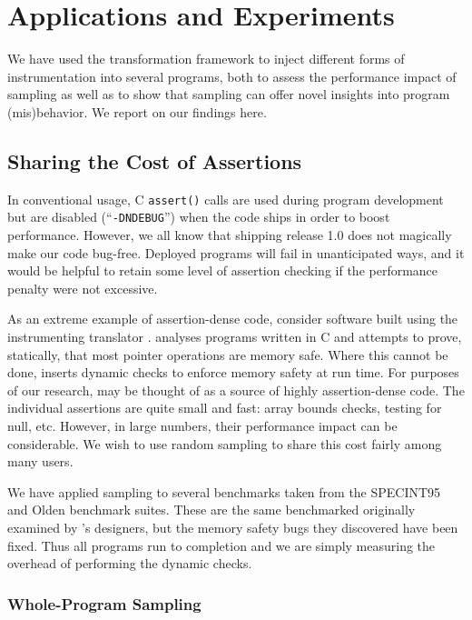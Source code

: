 \section{Applications and Experiments}
\label{sec:applications}

We have used the transformation framework to inject different forms of
instrumentation into several programs, both to assess the performance
impact of sampling as well as to show that sampling can offer novel
insights into program (mis)behavior.  We report on our findings here.

\subsection{Sharing the Cost of Assertions}

In conventional usage, C \texttt{assert()} calls are used during
program development but are disabled (``\texttt{-DNDEBUG}'') when the
code ships in order to boost performance.  However, we all know that
shipping release 1.0 does not magically make our code bug-free.
Deployed programs will fail in unanticipated ways, and it would be
helpful to retain some level of assertion checking if the performance
penalty were not excessive.

As an extreme example of assertion-dense code, consider software built
using the \CCured instrumenting translator \cite{POPL_'02*128}.
\CCured analyses programs written in C and attempts to prove,
statically, that most pointer operations are memory safe.  Where this
cannot be done, \CCured inserts dynamic checks to enforce memory
safety at run time.  For purposes of our research, \CCured may be
thought of as a source of highly assertion-dense code.  The individual
assertions are quite small and fast: array bounds checks, testing for
null, etc.  However, in large numbers, their performance impact can be
considerable.  We wish to use random sampling to share this cost
fairly among many users.

We have applied sampling to several benchmarks taken from the
SPECINT95 \cite{SPEC95} and Olden \cite{Carlisle:1996:OPPWDDSDMM}
benchmark suites.  These are the same benchmarked originally examined
by \CCured's designers, but the memory safety bugs they discovered
have been fixed.  Thus all programs run to completion and we are
simply measuring the overhead of performing the dynamic checks.

\subsubsection{Whole-Program Sampling}
\label{sec:ccured:whole}

